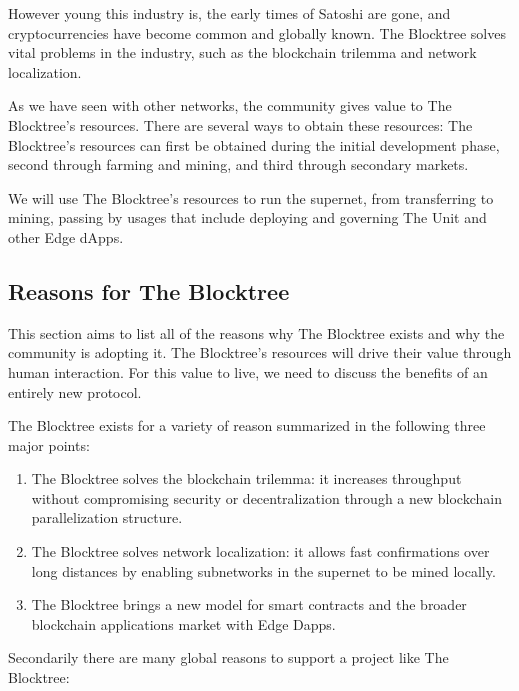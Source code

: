 \documentclass[12pt]{article}
\begin{document}
However young this industry is, the early times of Satoshi are gone, and cryptocurrencies have become common and globally known. The Blocktree solves vital problems in the industry, such as the blockchain trilemma and network localization. 

As we have seen with other networks, the community gives value to The Blocktree's resources. There are several ways to obtain these resources: The Blocktree's resources can first be obtained during the initial development phase, second through farming and mining, and third through secondary markets. 

We will use The Blocktree's resources to run the supernet, from transferring to mining, passing by usages that include deploying and governing The Unit and other Edge dApps.


\subsection{Reasons for The Blocktree}

This section aims to list all of the reasons why The Blocktree exists and why the community is adopting it. The Blocktree's resources will drive their value through human interaction. For this value to live, we need to discuss the benefits of an entirely new protocol.

The Blocktree exists for a variety of reason summarized in the following three major points:

\begin{enumerate}

\item The Blocktree solves the blockchain trilemma: it increases throughput without compromising security or decentralization through a new blockchain parallelization structure.

\item The Blocktree solves network localization: it allows fast confirmations over long distances by enabling subnetworks in the supernet to be mined locally. 

\item The Blocktree brings a new model for smart contracts and the broader blockchain applications market with Edge Dapps.

\end{enumerate}

Secondarily there are many global reasons to support a project like The Blocktree:
\end{document}
